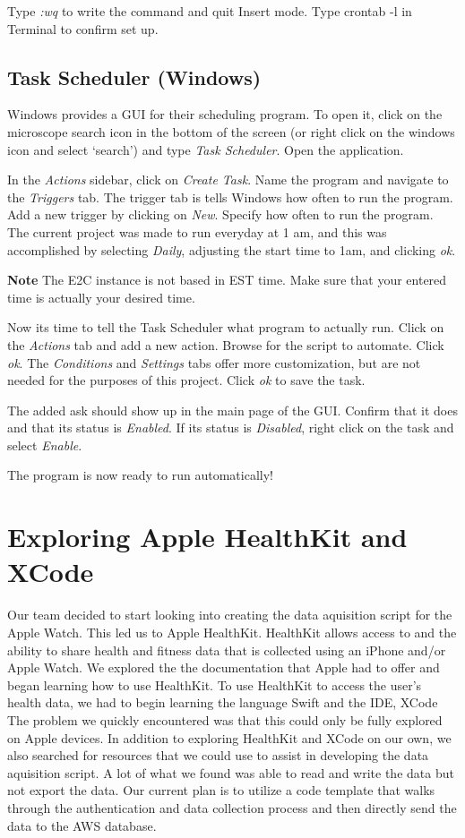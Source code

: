\documentclass[]{book}
\begin{document}
Type \emph{:wq} to write the command and quit Insert mode. Type crontab
-l in Terminal to confirm set up.

\subsection{Task Scheduler (Windows)}\label{task-scheduler-windows}

Windows provides a GUI for their scheduling program. To open it, click
on the microscope search icon in the bottom of the screen (or right
click on the windows icon and select `search') and type \emph{Task
Scheduler}. Open the application.

In the \emph{Actions} sidebar, click on \emph{Create Task}. Name the
program and navigate to the \emph{Triggers} tab. The trigger tab is
tells Windows how often to run the program. Add a new trigger by
clicking on \emph{New}. Specify how often to run the program. The
current project was made to run everyday at 1 am, and this was
accomplished by selecting \emph{Daily}, adjusting the start time to 1am,
and clicking \emph{ok}.

\textbf{Note} The E2C instance is not based in EST time. Make sure that
your entered time is actually your desired time.

Now its time to tell the Task Scheduler what program to actually run.
Click on the \emph{Actions} tab and add a new action. Browse for the
script to automate. Click \emph{ok}. The \emph{Conditions} and
\emph{Settings} tabs offer more customization, but are not needed for
the purposes of this project. Click \emph{ok} to save the task.

The added ask should show up in the main page of the GUI. Confirm that
it does and that its status is \emph{Enabled}. If its status is
\emph{Disabled}, right click on the task and select \emph{Enable}.

The program is now ready to run automatically!

\section{Exploring Apple HealthKit and
XCode}\label{exploring-apple-healthkit-and-xcode}

Our team decided to start looking into creating the data aquisition
script for the Apple Watch. This led us to Apple HealthKit. HealthKit
allows access to and the ability to share health and fitness data that
is collected using an iPhone and/or Apple Watch. We explored the the
documentation that Apple had to offer and began learning how to use
HealthKit. To use HealthKit to access the user's health data, we had to
begin learning the language Swift and the IDE, XCode The problem we
quickly encountered was that this could only be fully explored on Apple
devices. In addition to exploring HealthKit and XCode on our own, we
also searched for resources that we could use to assist in developing
the data aquisition script. A lot of what we found was able to read and
write the data but not export the data. Our current plan is to utilize a
code template that walks through the authentication and data collection
process and then directly send the data to the AWS database.
\end{document}

